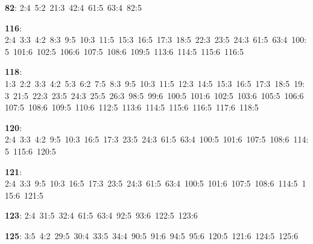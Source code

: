 \noindent \textbf{82}: 2:4\allowbreak\ 5:2\allowbreak\ 21:3\allowbreak\ 42:4\allowbreak\ 61:5\allowbreak\ 63:4\allowbreak\ 82:5\par
\noindent \textbf{116}: 2:4\allowbreak\ 3:3\allowbreak\ 4:2\allowbreak\ 8:3\allowbreak\ 9:5\allowbreak\ 10:3\allowbreak\ 11:5\allowbreak\ 15:3\allowbreak\ 16:5\allowbreak\ 17:3\allowbreak\ 18:5\allowbreak\ 22:3\allowbreak\ 23:5\allowbreak\ 24:3\allowbreak\ 61:5\allowbreak\ 63:4\allowbreak\ 100:5\allowbreak\ 101:6\allowbreak\ 102:5\allowbreak\ 106:6\allowbreak\ 107:5\allowbreak\ 108:6\allowbreak\ 109:5\allowbreak\ 113:6\allowbreak\ 114:5\allowbreak\ 115:6\allowbreak\ 116:5\par
\noindent \textbf{118}: 1:3\allowbreak\ 2:2\allowbreak\ 3:3\allowbreak\ 4:2\allowbreak\ 5:3\allowbreak\ 6:2\allowbreak\ 7:5\allowbreak\ 8:3\allowbreak\ 9:5\allowbreak\ 10:3\allowbreak\ 11:5\allowbreak\ 12:3\allowbreak\ 14:5\allowbreak\ 15:3\allowbreak\ 16:5\allowbreak\ 17:3\allowbreak\ 18:5\allowbreak\ 19:3\allowbreak\ 21:5\allowbreak\ 22:3\allowbreak\ 23:5\allowbreak\ 24:3\allowbreak\ 25:5\allowbreak\ 26:3\allowbreak\ 98:5\allowbreak\ 99:6\allowbreak\ 100:5\allowbreak\ 101:6\allowbreak\ 102:5\allowbreak\ 103:6\allowbreak\ 105:5\allowbreak\ 106:6\allowbreak\ 107:5\allowbreak\ 108:6\allowbreak\ 109:5\allowbreak\ 110:6\allowbreak\ 112:5\allowbreak\ 113:6\allowbreak\ 114:5\allowbreak\ 115:6\allowbreak\ 116:5\allowbreak\ 117:6\allowbreak\ 118:5\par
\noindent \textbf{120}: 2:4\allowbreak\ 3:3\allowbreak\ 4:2\allowbreak\ 9:5\allowbreak\ 10:3\allowbreak\ 16:5\allowbreak\ 17:3\allowbreak\ 23:5\allowbreak\ 24:3\allowbreak\ 61:5\allowbreak\ 63:4\allowbreak\ 100:5\allowbreak\ 101:6\allowbreak\ 107:5\allowbreak\ 108:6\allowbreak\ 114:5\allowbreak\ 115:6\allowbreak\ 120:5\par
\noindent \textbf{121}: 2:4\allowbreak\ 3:3\allowbreak\ 9:5\allowbreak\ 10:3\allowbreak\ 16:5\allowbreak\ 17:3\allowbreak\ 23:5\allowbreak\ 24:3\allowbreak\ 61:5\allowbreak\ 63:4\allowbreak\ 100:5\allowbreak\ 101:6\allowbreak\ 107:5\allowbreak\ 108:6\allowbreak\ 114:5\allowbreak\ 115:6\allowbreak\ 121:5\par
\noindent \textbf{123}: 2:4\allowbreak\ 31:5\allowbreak\ 32:4\allowbreak\ 61:5\allowbreak\ 63:4\allowbreak\ 92:5\allowbreak\ 93:6\allowbreak\ 122:5\allowbreak\ 123:6\par
\noindent \textbf{125}: 3:5\allowbreak\ 4:2\allowbreak\ 29:5\allowbreak\ 30:4\allowbreak\ 33:5\allowbreak\ 34:4\allowbreak\ 90:5\allowbreak\ 91:6\allowbreak\ 94:5\allowbreak\ 95:6\allowbreak\ 120:5\allowbreak\ 121:6\allowbreak\ 124:5\allowbreak\ 125:6\par

